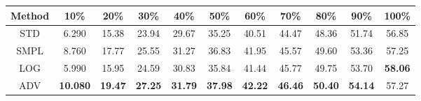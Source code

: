 \documentclass{standalone}
\begin{document}
\begin{tabular}{c|cccccccccc}
      \toprule
      Method & 10\% & 20\% & 30\% & 40\% & 50\% & 60\% & 70\% & 80\% & 90\% & 100\% \\
      \midrule
STD & 6.290 & 15.38 & 23.94 & 29.67 & 35.25 & 40.51 & 44.47 & 48.36 & 51.74 & 56.85\\
SMPL & 8.760 & 17.77 & 25.55 & 31.27 & 36.83 & 41.95 & 45.57 & 49.60 & 53.36 & 57.25\\
LOG & 5.990 & 15.95 & 24.59 & 30.83 & 35.84 & 41.44 & 45.77 & 49.75 & 53.70 & \textbf{58.06}\\
ADV & \textbf{10.080} & \textbf{19.47} & \textbf{27.25} & \textbf{31.79} & \textbf{37.98} & \textbf{42.22} & \textbf{46.46} & \textbf{50.40} & \textbf{54.14} & 57.27\\
  \bottomrule
\end{tabular}
\end{document}
